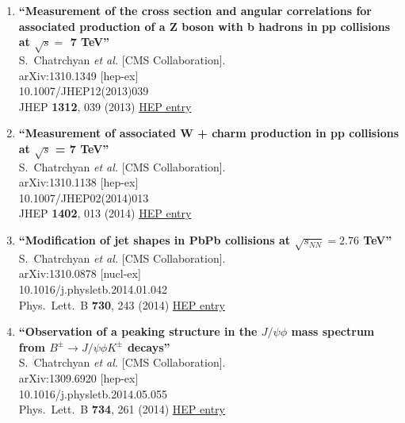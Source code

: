 \documentclass{article}
\begin{document}
\begin{enumerate}
\item%
{\bf ``Measurement of the cross section and angular correlations for associated production of a Z boson with b hadrons in pp collisions at $\sqrt{s} =$ 7 TeV''}
  \\{}S.~Chatrchyan {\it et al.} [CMS Collaboration].
  \\{}arXiv:1310.1349 [hep-ex]
    \\{}10.1007/JHEP12(2013)039
\\{}JHEP {\bf 1312}, 039 (2013) %
\href{http://inspirehep.net/record/1256943}{HEP entry}


\item%
{\bf ``Measurement of associated W + charm production in pp collisions at $\sqrt{s}$ = 7 TeV''}
  \\{}S.~Chatrchyan {\it et al.} [CMS Collaboration].
  \\{}arXiv:1310.1138 [hep-ex]
    \\{}10.1007/JHEP02(2014)013
\\{}JHEP {\bf 1402}, 013 (2014) %
\href{http://inspirehep.net/record/1256938}{HEP entry}


\item%
{\bf ``Modification of jet shapes in PbPb collisions at $\sqrt {s_{NN}} = 2.76$ TeV''}
  \\{}S.~Chatrchyan {\it et al.} [CMS Collaboration].
  \\{}arXiv:1310.0878 [nucl-ex]
    \\{}10.1016/j.physletb.2014.01.042
\\{}Phys.\ Lett.\ B {\bf 730}, 243 (2014) %
\href{http://inspirehep.net/record/1256590}{HEP entry}


\item%
{\bf ``Observation of a peaking structure in the $J/\psi \phi$ mass spectrum from $B^{\pm} \to J/\psi \phi K^{\pm}$ decays''}
  \\{}S.~Chatrchyan {\it et al.} [CMS Collaboration].
  \\{}arXiv:1309.6920 [hep-ex]
    \\{}10.1016/j.physletb.2014.05.055
\\{}Phys.\ Lett.\ B {\bf 734}, 261 (2014) %
\href{http://inspirehep.net/record/1255647}{HEP entry}



\end{enumerate}
\end{document}
